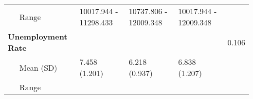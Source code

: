 \begin{longtable}[c]{@{}lllll@{}}
\begin{minipage}[t]{0.33\columnwidth}
~~~Range
\end{minipage} & \begin{minipage}[t]{0.15\columnwidth}\raggedright
10017.944 - 11298.433
\end{minipage} & \begin{minipage}[t]{0.15\columnwidth}\raggedright
10737.806 - 12009.348
\end{minipage} & \begin{minipage}[t]{0.15\columnwidth}\raggedright
10017.944 - 12009.348
\end{minipage} & \begin{minipage}[t]{0.52\columnwidth}\raggedright
\end{minipage}
\\\addlinespace
\begin{minipage}[t]{0.33\columnwidth}\raggedright
\textbf{Unemployment Rate}
\end{minipage} & \begin{minipage}[t]{0.15\columnwidth}\raggedright
\end{minipage} & \begin{minipage}[t]{0.15\columnwidth}\raggedright
\end{minipage} & \begin{minipage}[t]{0.15\columnwidth}\raggedright
\end{minipage} & \begin{minipage}[t]{0.52\columnwidth}\raggedright
0.106
\end{minipage}
\\\addlinespace
\begin{minipage}[t]{0.33\columnwidth}\raggedright
~~~Mean (SD)
\end{minipage} & \begin{minipage}[t]{0.15\columnwidth}\raggedright
7.458 (1.201)
\end{minipage} & \begin{minipage}[t]{0.15\columnwidth}\raggedright
6.218 (0.937)
\end{minipage} & \begin{minipage}[t]{0.15\columnwidth}\raggedright
6.838 (1.207)
\end{minipage} & \begin{minipage}[t]{0.52\columnwidth}\raggedright
\end{minipage}
\\\addlinespace
\begin{minipage}[t]{0.33\columnwidth}\raggedright
~~~Range
\end{minipage} & \begin{minipage}[t]{0.15\columnwidth}\raggedright

\end{minipage}
\end{longtable}
